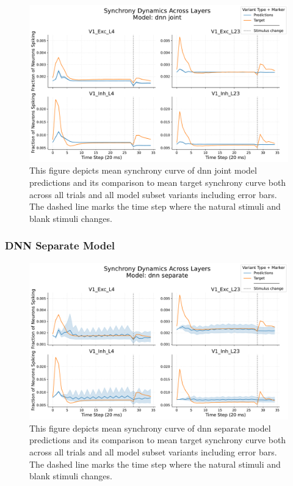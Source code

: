 \begin{figure}
    \centering
    \includegraphics[width=\linewidth]{img/plots/separate_model_synchrony_curve_dnn_joint_evaluation.pdf}
    \caption{This figure depicts mean synchrony curve of dnn joint model predictions and its comparison to mean target synchrony curve both across all trials and all model subset variants including error bars. The dashed line marks the time step where the natural stimuli and blank stimuli changes.}
    \label{fig:synchrony_curve_dnn_joint}
\end{figure}


\subsubsection{DNN Separate Model}
\label{{subsubsec:dnn_separate_eval}}
\begin{figure}
    \centering
    \includegraphics[width=\linewidth]{img/plots/separate_model_synchrony_curve_dnn_separate_evaluation.pdf}
    \caption{This figure depicts mean synchrony curve of dnn separate model predictions and its comparison to mean target synchrony curve both across all trials and all model subset variants including error bars. The dashed line marks the time step where the natural stimuli and blank stimuli changes.}
    \label{fig:synchrony_curve_dnn_separate}
\end{figure}

